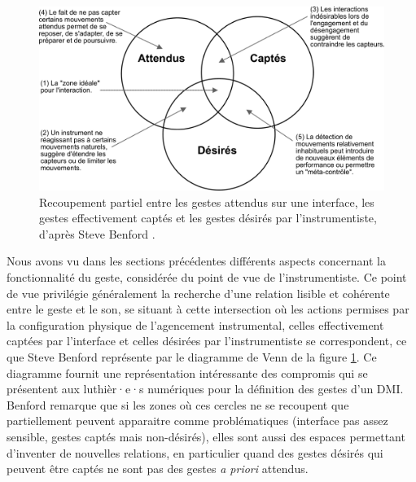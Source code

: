 \begin{figure}[!ht]
	\captionsetup{format=plain}%
	  \includegraphics[width=\linewidth]{gfx/03_gesture/Benford_expected-sensed-desired.pdf}
		\caption[Gestes attendus, désirés, et captés sur une interface]{Recoupement partiel entre les gestes attendus sur une interface, les gestes effectivement captés et les gestes désirés par l'instrumentiste, d'après Steve Benford \cite{benford_performing_2010}.}
		\label{fig:Benford_expected-sensed-desired}
\end{figure}
\indent Nous avons vu dans les sections précédentes différents aspects concernant la fonctionnalité du geste, considérée du point de vue de l'instrumentiste. Ce point de vue privilégie généralement la recherche d'une relation lisible et cohérente entre le geste et le son, se situant à cette intersection où les actions permises par la configuration physique de l'agencement instrumental, celles effectivement captées par l'interface et celles désirées par l'instrumentiste se correspondent, ce que Steve Benford représente par le diagramme de Venn de la figure \ref{fig:Benford_expected-sensed-desired}. Ce diagramme fournit une représentation intéressante des compromis qui se présentent aux luthièr·e·s numériques pour la définition des gestes d'un \gls{DMI}. Benford remarque que si les zones où ces cercles ne se recoupent que partiellement peuvent apparaitre comme problématiques (interface pas assez sensible, gestes captés mais non-désirés), elles sont aussi des espaces permettant d'inventer de nouvelles relations, en particulier quand des gestes désirés qui peuvent être captés ne sont pas des gestes \textit{a priori} attendus.\\

